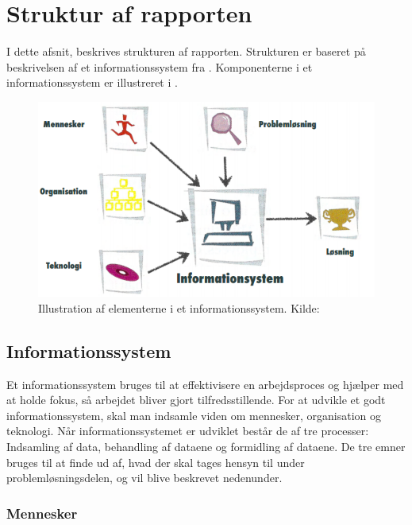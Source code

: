 \chapter{Struktur af rapporten}\label{chap:struktur-af-problemanalyse}

I dette afsnit, beskrives strukturen af rapporten. Strukturen er baseret på beskrivelsen af et
informationssystem fra \citet{Laudon1999}. Komponenterne i et informationssystem er illustreret i
.

\begin{figure}[htbp]
  \centering
  \includegraphics{images/kontekstmodel/metode.png}
  \caption[Metode for Kontekstmodellen]{Illustration af elementerne i et informationssystem. Kilde:
  \protect\citet{Laudon1999}}
  \label{fig:kontekstmodel}
\end{figure}


\section{Informationssystem}\label{sec:Informationssystem}

Et informationssystem bruges til at effektivisere en arbejdsproces og hjælper med at holde fokus, så arbejdet bliver
gjort tilfredsstillende. For at udvikle et godt informationssystem, skal man indsamle viden om mennesker, organisation
og teknologi. Når informationssystemet er udviklet består de af tre processer: Indsamling af data, behandling af dataene
og formidling af dataene. De tre emner bruges til at finde ud af, hvad der skal tages hensyn til under
problemløsningsdelen, og vil blive beskrevet nedenunder.


\subsection{Mennesker}\label{subsec:mennesker}

